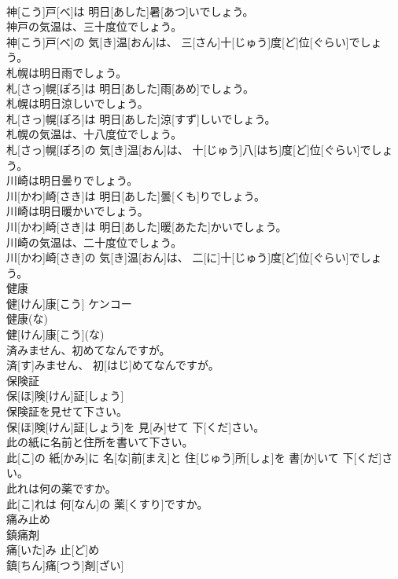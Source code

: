 \documentclass[8pt]{extreport}
\begin{document}
\begin{CJK}{UTF8}{min}
\\	神[こう]戸[べ]は 明日[あした]暑[あつ]いでしょう。
\\	神戸の気温は、三十度位でしょう。	
\\	神[こう]戸[べ]の 気[き]温[おん]は、 三[さん]十[じゅう]度[ど]位[ぐらい]でしょう。
\\	札幌は明日雨でしょう。	
\\	札[さっ]幌[ぽろ]は 明日[あした]雨[あめ]でしょう。
\\	札幌は明日涼しいでしょう。	
\\	札[さっ]幌[ぽろ]は 明日[あした]涼[すず]しいでしょう。
\\	札幌の気温は、十八度位でしょう。	
\\	札[さっ]幌[ぽろ]の 気[き]温[おん]は、 十[じゅう]八[はち]度[ど]位[ぐらい]でしょう。
\\	川崎は明日曇りでしょう。	
\\	川[かわ]崎[さき]は 明日[あした]曇[くも]りでしょう。
\\	川崎は明日暖かいでしょう。	
\\	川[かわ]崎[さき]は 明日[あした]暖[あたた]かいでしょう。
\\	川崎の気温は、二十度位でしょう。	
\\	川[かわ]崎[さき]の 気[き]温[おん]は、 二[に]十[じゅう]度[ど]位[ぐらい]でしょう。
\\	健康	
\\	健[けん]康[こう]	ケンコー
\\	健康(な)	
\\	健[けん]康[こう](な)	
\\	済みません、初めてなんですが。	
\\	済[す]みません、 初[はじ]めてなんですが。
\\	保険証	
\\	保[ほ]険[けん]証[しょう]	
\\	保険証を見せて下さい。	
\\	保[ほ]険[けん]証[しょう]を 見[み]せて 下[くだ]さい。
\\	此の紙に名前と住所を書いて下さい。	
\\	此[こ]の 紙[かみ]に 名[な]前[まえ]と 住[じゅう]所[しょ]を 書[か]いて 下[くだ]さい。
\\	此れは何の薬ですか。	
\\	此[こ]れは 何[なん]の 薬[くすり]ですか。
\\	痛み止め 
\\	鎮痛剤	
\\	痛[いた]み 止[ど]め 
\\	鎮[ちん]痛[つう]剤[ざい]

\end{CJK}
\end{document}
